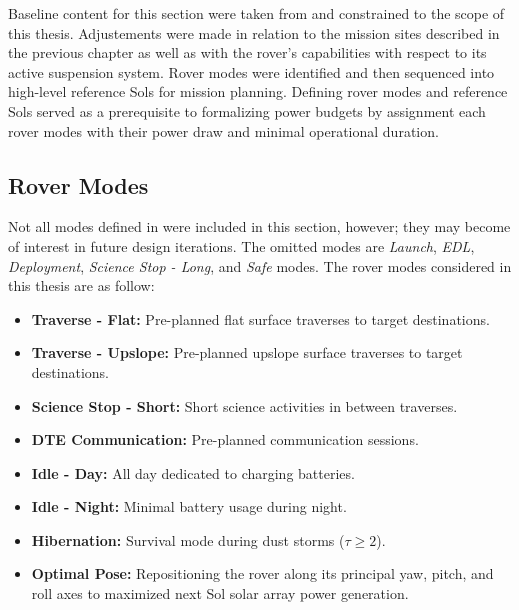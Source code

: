 Baseline content for this section were taken from  and constrained to the scope of this thesis. Adjustements were made in relation to the mission sites described in the previous chapter as well as with the rover's capabilities with respect to its active suspension system. Rover modes were identified and then sequenced into high-level reference Sols for mission planning. Defining rover modes and reference Sols served as a prerequisite to formalizing power budgets by assignment each rover modes with their power draw and minimal operational duration.


\subsection{Rover Modes}
\label{sec:ReferenceSols:RoverModes}
Not all modes defined in  were included in this section, however; they may become of interest in future design iterations. The omitted modes are \textit{Launch}, \textit{\ac{EDL}}, \textit{Deployment}, \textit{Science Stop - Long},  and \textit{Safe} modes. The rover modes considered in this thesis are as follow:

\begin{itemize}
    \item \textbf{Traverse - Flat:} Pre-planned flat surface traverses to target destinations.
    \item \textbf{Traverse - Upslope:} Pre-planned upslope surface traverses to target destinations.
    \item \textbf{Science Stop - Short:} Short science activities in between traverses.
    \item \textbf{\ac{DTE} Communication:} Pre-planned communication sessions.
    \item \textbf{Idle - Day:} All day dedicated to charging batteries.
    \item \textbf{Idle - Night:} Minimal battery usage during night.
    \item \textbf{Hibernation:} Survival mode during dust storms ($\tau \geq 2$).
    \item \textbf{Optimal Pose:} Repositioning the rover along its principal yaw, pitch, and roll axes to maximized next Sol solar array power generation.
\end{itemize}

